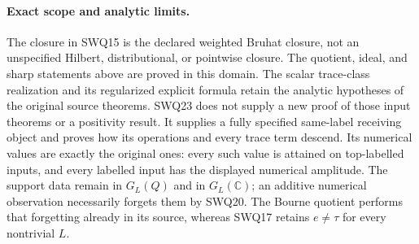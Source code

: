 \paragraph{Exact scope and analytic limits.}
The closure in SWQ15 is the declared weighted Bruhat closure, not
an unspecified Hilbert, distributional, or pointwise closure.
The quotient, ideal, and sharp statements above are proved in this
domain. The scalar trace-class realization and its regularized
explicit formula retain the analytic hypotheses of the original
source theorems. SWQ23 does not supply a new proof of those input
theorems or a positivity result. It supplies a fully specified
same-label receiving object and proves how its operations and every
trace term descend. Its numerical values are exactly the original
ones: every such value is attained on top-labelled inputs, and every
labelled input has the displayed numerical amplitude. The support
data remain in $G_L(Q)$ and in $G_L(\mathbb C)$; an additive
numerical observation necessarily forgets them by SWQ20. The Bourne
quotient performs that forgetting already in its source, whereas
SWQ17 retains $e\ne\tau$ for every nontrivial $L$.
